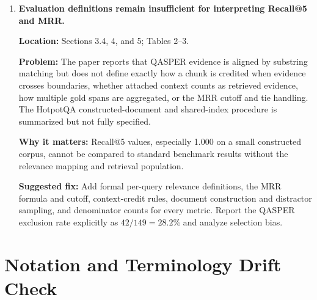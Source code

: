 \documentclass[11pt]{article}
\newcommand{\location}[1]{\textbf{Location:} #1}
\newcommand{\problem}{\textbf{Problem:} }
\newcommand{\impact}{\textbf{Why it matters:} }
\newcommand{\fix}{\textbf{Suggested fix:} }
\begin{document}
\begin{enumerate}
  \impact A three-answer difference can double HotpotQA EM from $3/25$ to $6/25$, while unmatched evidence volume can explain part of the F1 change. Relative percentages amplify small-denominator pilot fluctuations.

  \fix Use ``reported relative increase/decrease in the 25-query pilot,'' give the absolute counts where available, and avoid causal language until matched-budget and paired-query analyses are complete.

  \item \textbf{Evaluation definitions remain insufficient for interpreting Recall@5 and MRR.}

  \location{Sections 3.4, 4, and 5; Tables 2--3.}

  \problem The paper reports that QASPER evidence is aligned by substring matching but does not define exactly how a chunk is credited when evidence crosses boundaries, whether attached context counts as retrieved evidence, how multiple gold spans are aggregated, or the MRR cutoff and tie handling. The HotpotQA constructed-document and shared-index procedure is summarized but not fully specified.

  \impact Recall@5 values, especially 1.000 on a small constructed corpus, cannot be compared to standard benchmark results without the relevance mapping and retrieval population.

  \fix Add formal per-query relevance definitions, the MRR formula and cutoff, context-credit rules, document construction and distractor sampling, and denominator counts for every metric. Report the QASPER exclusion rate explicitly as $42/149=28.2\%$ and analyze selection bias.
\end{enumerate}

\section*{Notation and Terminology Drift Check}
\end{document}
